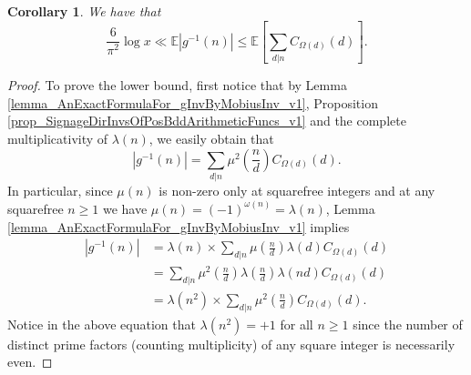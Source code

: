 \documentclass[11pt,reqno,a4letter]{article}
\numberwithin{figure}{section}
\numberwithin{table}{section}
\theoremstyle{plain}
\newtheorem{cor}[theorem]{Corollary}
\numberwithin{theorem}{section}
\theoremstyle{definition}
\begin{document}
\begin{cor} 
\label{lemma_BddExpectationOfgInvn} 
We have that 
\[
\frac{6}{\pi^2} \log x \ll \mathbb{E}|g^{-1}(n)| \leq \mathbb{E}\left[\sum_{d|n} C_{\Omega(d)}(d)\right]. 
\]
\end{cor} 
\begin{proof} 
To prove the lower bound, first notice that by 
Lemma \ref{lemma_AnExactFormulaFor_gInvByMobiusInv_v1}, 
Proposition \ref{prop_SignageDirInvsOfPosBddArithmeticFuncs_v1} and the 
complete multiplicativity of $\lambda(n)$, 
we easily obtain that 
\begin{equation} 
\label{eqn_AbsValueOf_gInvn_FornSquareFree_v1} 
|g^{-1}(n)| = \sum_{d|n} \mu^2\left(\frac{n}{d}\right) C_{\Omega(d)}(d). 
\end{equation} 
In particular, since $\mu(n)$ is non-zero only at squarefree integers and 
at any squarefree $n \geq 1$ we have $\mu(n) = (-1)^{\omega(n)} = \lambda(n)$, 
Lemma \ref{lemma_AnExactFormulaFor_gInvByMobiusInv_v1} implies 
\begin{align*} 
|g^{-1}(n)| & = \lambda(n) \times \sum_{d|n} \mu\left(\frac{n}{d}\right) \lambda(d) C_{\Omega(d)}(d) \\ 
     & = \sum_{d|n} \mu^2\left(\frac{n}{d}\right) \lambda\left(\frac{n}{d}\right) 
     \lambda(nd) C_{\Omega(d)}(d) \\ 
     & = \lambda(n^2) \times \sum_{d|n} \mu^2\left(\frac{n}{d}\right) C_{\Omega(d)}(d). 
\end{align*} 
Notice in the above equation 
that $\lambda(n^2) = +1$ for all $n \geq 1$ since the number of distinct 
prime factors (counting multiplicity) of any square integer is necessarily even. 
     

\end{proof}
\end{document}
